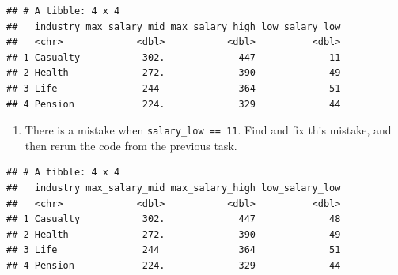\documentclass[]{book}
\newenvironment{Shaded}{\begin{snugshade}}{\end{snugshade}}
\newcommand{\CommentTok}[1]{\textcolor[rgb]{0.56,0.35,0.01}{\textit{#1}}}
\newcommand{\DataTypeTok}[1]{\textcolor[rgb]{0.13,0.29,0.53}{#1}}
\newcommand{\DecValTok}[1]{\textcolor[rgb]{0.00,0.00,0.81}{#1}}
\newcommand{\KeywordTok}[1]{\textcolor[rgb]{0.13,0.29,0.53}{\textbf{#1}}}
\newcommand{\NormalTok}[1]{#1}
\newcommand{\OperatorTok}[1]{\textcolor[rgb]{0.81,0.36,0.00}{\textbf{#1}}}
\newcommand{\StringTok}[1]{\textcolor[rgb]{0.31,0.60,0.02}{#1}}
\providecommand{\tightlist}{%
  \setlength{\itemsep}{0pt}\setlength{\parskip}{0pt}}
\begin{document}
\begin{verbatim}
## # A tibble: 4 x 4
##   industry max_salary_mid max_salary_high low_salary_low
##   <chr>             <dbl>           <dbl>          <dbl>
## 1 Casualty           302.             447             11
## 2 Health             272.             390             49
## 3 Life               244              364             51
## 4 Pension            224.             329             44
\end{verbatim}

\begin{enumerate}
\def\labelenumi{\arabic{enumi}.}
\setcounter{enumi}{5}
\tightlist
\item
  There is a mistake when \texttt{salary\_low\ ==\ 11}. Find and fix this mistake, and then rerun the code from the previous task.
\end{enumerate}

\begin{Shaded}
\end{Shaded}

\begin{verbatim}
## # A tibble: 4 x 4
##   industry max_salary_mid max_salary_high low_salary_low
##   <chr>             <dbl>           <dbl>          <dbl>
## 1 Casualty           302.             447             48
## 2 Health             272.             390             49
## 3 Life               244              364             51
## 4 Pension            224.             329             44
\end{verbatim}
\end{document}
